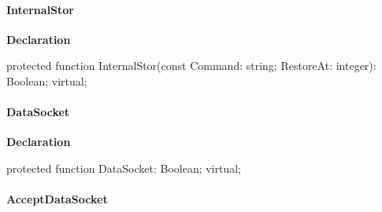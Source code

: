 \documentclass{report}
\newif\ifpdf
\begin{document}
\paragraph*{InternalStor}\hspace*{\fill}

\label{ftpsend.TFTPSend-InternalStor}
\begin{list}{}{
\setlength{\itemindent}{0cm}
\setlength{\listparindent}{0cm}
\setlength{\leftmargin}{\evensidemargin}
\addtolength{\leftmargin}{\tmplength}
\settowidth{\labelsep}{X}
\addtolength{\leftmargin}{\labelsep}
\setlength{\labelwidth}{\tmplength}
}
\item[\textbf{Declaration}\hfill]
\ifpdf
\begin{flushleft}
\fi
\begin{ttfamily}
protected function InternalStor(const Command: string; RestoreAt: integer): Boolean; virtual;\end{ttfamily}

\ifpdf
\end{flushleft}
\fi

\end{list}
\paragraph*{DataSocket}\hspace*{\fill}

\label{ftpsend.TFTPSend-DataSocket}
\begin{list}{}{
\setlength{\itemindent}{0cm}
\setlength{\listparindent}{0cm}
\setlength{\leftmargin}{\evensidemargin}
\addtolength{\leftmargin}{\tmplength}
\settowidth{\labelsep}{X}
\addtolength{\leftmargin}{\labelsep}
\setlength{\labelwidth}{\tmplength}
}
\item[\textbf{Declaration}\hfill]
\ifpdf
\begin{flushleft}
\fi
\begin{ttfamily}
protected function DataSocket: Boolean; virtual;\end{ttfamily}

\ifpdf
\end{flushleft}
\fi

\end{list}
\paragraph*{AcceptDataSocket}\hspace*{\fill}
\end{document}
